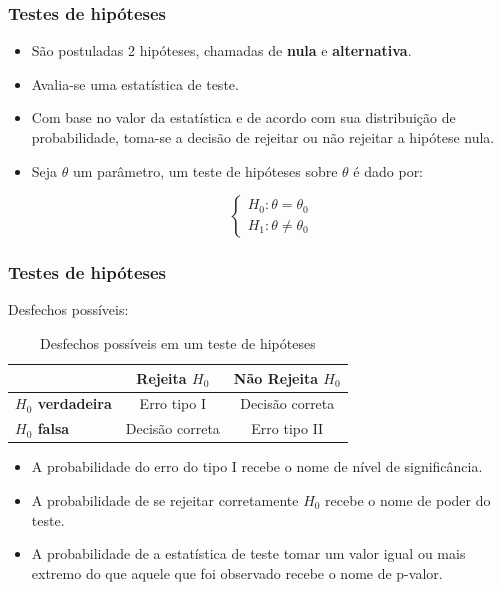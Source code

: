 \documentclass[10pt,
  aspectratio=169,
  serif,
  mathserif,
  professionalfont,
  compress,
  handout,
  ]{beamer}\usepackage[]{graphicx}\usepackage[]{color}
\begin{document}
\begin{frame}
  \frametitle{Testes de hipóteses}
  \begin{itemize}
    \itemsep 2ex
  
  \item São postuladas 2 hipóteses, chamadas de \textbf{nula} e \textbf{alternativa}.
  
  \item Avalia-se uma estatística de teste. 
  
  \item Com base no valor da estatística e de acordo com sua distribuição de probabilidade, toma-se a decisão de rejeitar ou não rejeitar a hipótese nula.
    
  \item Seja $\theta$ um parâmetro, um teste de hipóteses sobre $\theta$ é dado por:
  
  $$
\left\{\begin{matrix}
H_0: \theta = \theta_0 \\ 
H_1: \theta \neq \theta_0
\end{matrix}\right.
$$  
  
  \end{itemize}

\end{frame}


\begin{frame}
  \frametitle{Testes de hipóteses}
  
  Desfechos possíveis:
  
  \begin{table}[]
\begin{tabular}{l|cc}
\hline
\multicolumn{1}{c|}{}    & \textbf{Rejeita $H_0$} & \textbf{Não Rejeita $H_0$} \\ \hline
\textbf{$H_0$ verdadeira} & Erro tipo I           & Decisão correta           \\
\textbf{$H_0$ falsa}      & Decisão correta       & Erro tipo II              \\ \hline
\end{tabular}
\caption{Desfechos possíveis em um teste de hipóteses}
\label{tab:my-table}
\end{table}
  
  \begin{itemize}
    \itemsep 2ex
  
  \item A probabilidade do erro do tipo I recebe o nome de nível de significância.
  
  \item A probabilidade de se rejeitar corretamente $H_0$ recebe o nome de poder do teste.
  
  \item A probabilidade de a estatística de teste tomar um valor igual ou mais extremo do que aquele que foi observado recebe o nome de p-valor.
    
  \end{itemize}

\end{frame}
\end{document}
